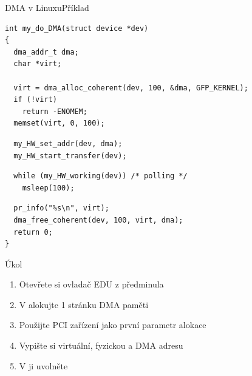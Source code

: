 \begin{frame}[fragile]{DMA v Linuxu}{Příklad}

  \begin{lstlisting}
int my_do_DMA(struct device *dev)
{
  dma_addr_t dma;
  char *virt;

  virt = dma_alloc_coherent(dev, 100, &dma, GFP_KERNEL);
  if (!virt)
    return -ENOMEM;
  memset(virt, 0, 100);
  \end{lstlisting} %
  \pause
  \begin{lstlisting}
  my_HW_set_addr(dev, dma);
  my_HW_start_transfer(dev);
  \end{lstlisting} %
  \pause
  \begin{lstlisting}
  while (my_HW_working(dev)) /* polling */
    msleep(100);
  \end{lstlisting} %
  \pause
  \begin{lstlisting}
  pr_info("%s\n", virt);
  dma_free_coherent(dev, 100, virt, dma);
  return 0;
}
  \end{lstlisting} %

\end{frame}

\begin{frame}{Úkol}

  \begin{enumerate}
    \item Otevřete si ovladač EDU z předminula
    \item V  alokujte 1 stránku DMA paměti
    \item Použijte PCI zařízení jako první parametr alokace
    \item Vypište si virtuální, fyzickou a DMA adresu
    \item V  ji uvolněte
  \end{enumerate}

\end{frame}

